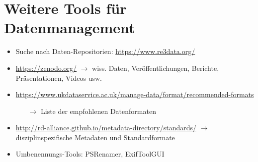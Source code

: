 \section{Weitere Tools für Datenmanagement}

\begin{itemize}
  \item Suche nach Daten-Repositorien: \url{https://www.re3data.org/}
  \item \url{https://zenodo.org/}  $\rightarrow$ wiss. Daten,
        Veröffentlichungen, Berichte, Präsentationen, Videos usw.
  \item \url{https://www.ukdataservice.ac.uk/manage-data/format/recommended-formats}
        \begin{itemize}
          \item[$\rightarrow$] Liste der empfohlenen Datenformaten
        \end{itemize}
  \item \url{http://rd-alliance.github.io/metadata-directory/standards/}
        $\rightarrow$ disziplinspezifische Metadaten und Standardformate
  \item Umbenennungs-Tools: PSRenamer, ExifToolGUI
\end{itemize}
